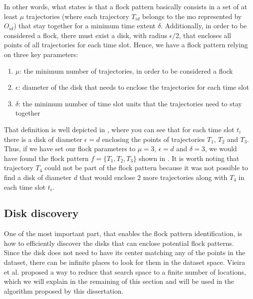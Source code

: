 In other words, what  states is that a flock pattern basically consists in a set of at least $\mu$
trajectories (where each trajectory $T_{id}$ belongs to the \ac{mo} represented by $O_{id}$) that stay together for a
minimum time extent $\delta$.  Additionally, in order to be considered a flock, there must exist a disk, with radius
$\epsilon/2$, that encloses all points of all trajectories for each time slot. Hence, we have a flock pattern relying on
three key parameters:

\begin{enumerate}
    \item $\mu$: the minimum number of trajectories, in order to be considered a flock
    \item $\epsilon$: diameter of the disk that needs to enclose the trajectories for each time slot
    \item $\delta$: the minimum number of time slot units that the trajectories need to stay together
\end{enumerate}

That definition is well depicted in , where you can see that for each time slot $t_i$ there is a disk
of diameter $\epsilon = d$ enclosing the points of trajectories $T_1$, $T_2$ and $T_3$. Thus, if we have set our flock
parameters to $\mu = 3$, $\epsilon = d$ and $\delta = 3$, we would have found the flock pattern $f = \{T_1, T_2, T_3\}$
shown in . It is worth noting that trajectory $T_4$ could not be part of the flock pattern because it
was not possible to find a disk of diameter $d$ that would enclose 2 more trajectories along with $T_4$ in each time
slot $t_i$.

\subsection{Disk discovery}
\label{subsec:disk_discovery}

One of the most important part, that enables the flock pattern identification, is how to efficiently discover the disks
that can enclose potential flock patterns. Since the disk does not need to have its center matching any of the points in
the dataset, there can be infinite places to look for them in the dataset space. Vieira et al. \citep{vieira} proposed a
way to reduce that search space to a finite number of locations, which we will explain in the remaining of this section
and will be used in the algorithm proposed by this dissertation.

